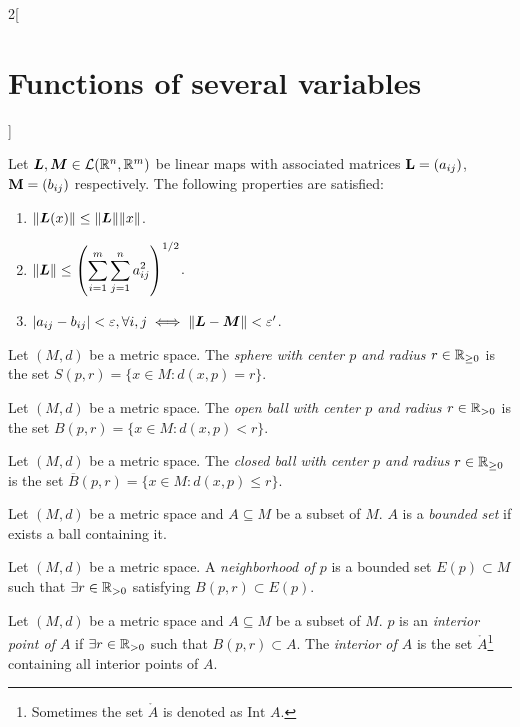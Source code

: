 \documentclass[../../../main.tex]{subfiles}
\begin{document}
\begin{multicols}{2}[\section{Functions of several variables}]
\begin{prop}
  \end{prop}
  \begin{corollary}
    Let $\boldsymbol{L},\boldsymbol{M}\in\mathcal{L}(\mathbb{R}^n,\mathbb{R}^m)$ be linear maps with associated matrices $\vb{L}=(a_{ij})$, $\vb{M}=(b_{ij})$ respectively. The following properties are satisfied:
    \begin{enumerate}
      \item $\|\boldsymbol{L}(x)\|\leq\|\boldsymbol{L}\|\|x\|$.
      \item $\displaystyle\|\boldsymbol{L}\|\leq\left(\sum_{i=1}^m\sum_{j=1}^na_{ij}^2\right)^{1/2}$.
      \item $|a_{ij}-b_{ij}|<\varepsilon,\forall i,j\iff\|\boldsymbol{L}-\boldsymbol{M}\|<\varepsilon'$.
    \end{enumerate}
  \end{corollary}
  \begin{definition}
    Let $(M,d)$ be a metric space. The \textit{sphere with center $p$ and radius $r\in\mathbb{R}_{\geq 0}$} is the set $S(p,r)=\{x\in M:d(x,p)=r\}$.
  \end{definition}
  \begin{definition}
    Let $(M,d)$ be a metric space. The \textit{open ball with center $p$ and radius $r\in\mathbb{R}_{>0}$} is the set $B(p,r)=\{x\in M:d(x,p)<r\}$.
  \end{definition}
  \begin{definition}
    Let $(M,d)$ be a metric space. The \textit{closed ball with center $p$ and radius $r\in\mathbb{R}_{\geq 0}$} is the set $\overline{B}(p,r)=\{x\in M:d(x,p)\leq r\}$.
  \end{definition}
  \begin{definition}
    Let $(M,d)$ be a metric space and $A\subseteq M$ be a subset of $M$. $A$ is a \textit{bounded set} if exists a ball containing it.
  \end{definition}
  \begin{definition}
    Let $(M,d)$ be a metric space. A \textit{neighborhood of $p$} is a bounded set $E(p)\subset M$ such that $\exists r\in\mathbb{R}_{>0}$ satisfying $B(p,r)\subset E(p)$.
  \end{definition}
  \begin{definition}
    Let $(M,d)$ be a metric space and $A\subseteq M$ be a subset of $M$. $p$ is an \textit{interior point of $A$} if $\exists r\in\mathbb{R}_{>0}$ such that $B(p,r)\subset A$. The \textit{interior of $A$} is the set $\mathring A$\footnote{Sometimes the set $\mathring A$ is denoted as $\text{Int }A$.} containing all interior points of $A$.

\end{definition}
\end{multicols}
\end{document}
